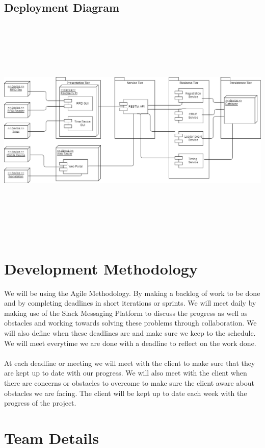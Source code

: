 \documentclass{article}
\begin{document}
\subsection{Deployment Diagram} 
\includegraphics[width=18cm,height=11cm,keepaspectratio]{ETA-Deployment.png}

\section{Development Methodology}
We will be using the Agile Methodology. By making a backlog of work to be done and by completing deadlines in short iterations or sprints. We will meet daily by making use of the Slack Messaging Platform to discuss the progress as well as obstacles and working towards solving these problems through collaboration. We will also define when these deadlines are and make sure we keep to the schedule. We will meet everytime we are done with a deadline to reflect on the work done. \\ \\
At each deadline or meeting we will meet with the client to make sure that they are kept up to date with our progress. We will also meet with the client when there are concerns or obstacles to overcome to make sure the client aware about obstacles we are facing. The client will be kept up to date each week with the progress of the project.

\newpage
\section{Team Details}
\end{document}
